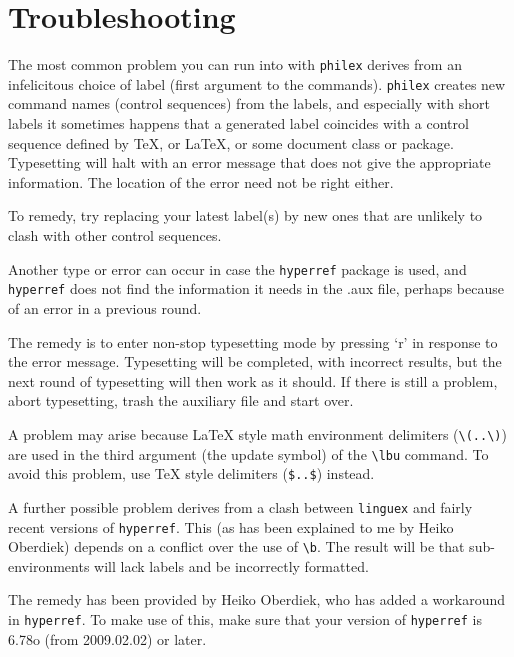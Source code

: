 \documentclass[11pt]{article}
\newcommand{\qut}[1]{`#1'}
\begin{document}
\setlength{\Extopsep}{.66\baselineskip}
\setlength{\Exredux}{-1\baselineskip}


\section{Troubleshooting}
The most  common problem you can run into with \verb+philex+ derives from an infelicitous choice of label (first argument to the commands). \verb+philex+ creates new command names (control sequences) from the labels, and especially with short labels it sometimes happens that a generated label coincides with a control sequence defined by TeX, or LaTeX, or some document class or package. Typesetting will halt with an error message that does not give the appropriate information. The location of the error need not be right either.

To remedy, try replacing your latest label(s) by new ones that are unlikely to clash with other control sequences.

Another type or error  can occur in case the \verb+hyperref+ package is used, and \verb+hyperref+ does not find the information it needs in the .aux file, perhaps because of an error in a previous round.

The remedy is to enter non-stop typesetting mode by pressing \qut{r} in response to the error message. Typesetting will be completed, with incorrect results, but the next round of typesetting will then work as it should. If there is still a problem, abort typesetting, trash the auxiliary file and start over.

A problem may arise  because LaTeX style math environment delimiters (\verb+\(..\)+) are used in the third argument (the update symbol) of the \verb+\lbu+ command. To avoid this problem, use TeX style delimiters (\verb+$..$+) instead.

A further possible problem derives from  a clash between \verb+linguex+ and fairly recent versions of \verb+hyperref+. This (as has been explained to me by Heiko Oberdiek) depends on a conflict over the use of \verb+\b+. The result will be that sub-environments will lack labels and be incorrectly formatted.

The remedy has been provided by Heiko Oberdiek, who has added a workaround in \verb+hyperref+. To make use of this, make sure that your version of \verb+hyperref+ is 6.78o (from 2009.02.02) or later.
\end{document}
